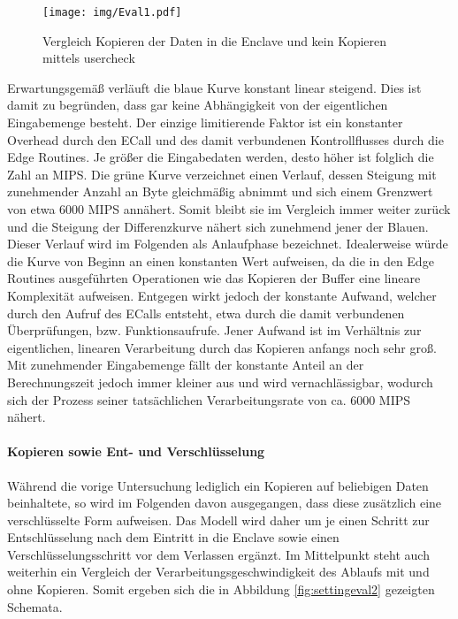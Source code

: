 \begin{figure}[h]
	\texttt{[image: img/Eval1.pdf]}
	\centering
	\caption{Vergleich Kopieren der Daten in die Enclave und kein Kopieren mittels user\textunderscore check}
	\label{fig:eval1}
\end{figure}

Erwartungsgemäß verläuft die blaue Kurve konstant linear steigend. Dies ist damit zu begründen, dass gar keine Abhängigkeit von der eigentlichen Eingabemenge besteht. Der einzige limitierende Faktor ist ein konstanter Overhead durch den \ac{ECall} und des damit verbundenen Kontrollflusses durch die Edge Routines. Je größer die Eingabedaten werden, desto höher ist folglich die Zahl an \ac{MIPS}. Die grüne Kurve verzeichnet einen Verlauf, dessen Steigung mit zunehmender Anzahl an Byte gleichmäßig abnimmt und sich einem Grenzwert von etwa 6000 \ac{MIPS} annähert. Somit bleibt sie im Vergleich immer weiter zurück und die Steigung der Differenzkurve nähert sich zunehmend jener der Blauen. Dieser Verlauf wird im Folgenden als Anlaufphase bezeichnet. Idealerweise würde die Kurve von Beginn an einen konstanten Wert aufweisen, da die in den Edge Routines ausgeführten Operationen wie das Kopieren der Buffer eine lineare Komplexität aufweisen. Entgegen wirkt jedoch der konstante Aufwand, welcher durch den Aufruf des \acp{ECall} entsteht, etwa durch die damit verbundenen Überprüfungen, bzw. Funktionsaufrufe. Jener Aufwand ist im Verhältnis zur eigentlichen, linearen Verarbeitung durch das Kopieren anfangs noch sehr groß. Mit zunehmender Eingabemenge fällt der konstante Anteil an der Berechnungszeit jedoch immer kleiner aus und wird vernachlässigbar, wodurch sich der Prozess seiner tatsächlichen Verarbeitungsrate von ca. 6000 \ac{MIPS} nähert.

\paragraph{Kopieren sowie Ent- und Verschlüsselung}

Während die vorige Untersuchung lediglich ein Kopieren auf beliebigen Daten beinhaltete, so wird im Folgenden davon ausgegangen, dass diese zusätzlich eine verschlüsselte Form aufweisen. Das Modell wird daher um je einen Schritt zur Entschlüsselung nach dem Eintritt in die Enclave sowie einen Verschlüsselungsschritt vor dem Verlassen ergänzt. Im Mittelpunkt steht auch weiterhin ein Vergleich der Verarbeitungsgeschwindigkeit des Ablaufs mit und ohne Kopieren. Somit ergeben sich die in Abbildung \ref{fig:settingeval2} gezeigten Schemata.

